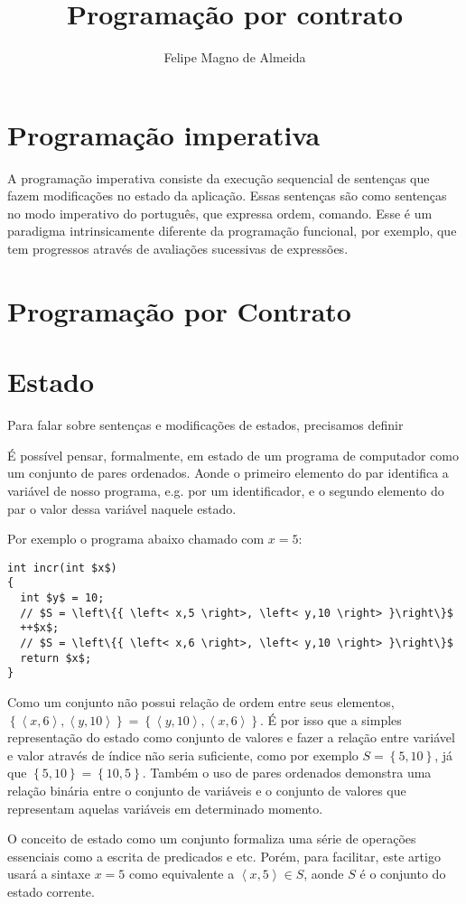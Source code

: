 \documentclass[12pt]{article}
\title{Programação por contrato}
\author{Felipe Magno de Almeida}
\begin{document}
 

\maketitle
     
\begin{resumo} 
  
\end{resumo}

\section{Programação imperativa}

A programação imperativa consiste da execução sequencial de sentenças
que fazem modificações no estado da aplicação. Essas sentenças são
como sentenças no modo imperativo do português, que expressa ordem,
comando. Esse é um paradigma intrinsicamente diferente da programação
funcional, por exemplo, que tem progressos através de avaliações
sucessivas de expressões.

\section{Programação por Contrato}



\section{Estado}

Para falar sobre sentenças e modificações de estados, precisamos definir 

É possível pensar, formalmente, em estado de um programa de computador
como um conjunto de pares ordenados. Aonde o primeiro elemento do par
identifica a variável de nosso programa, e.g. por um identificador, e
o segundo elemento do par o valor dessa variável naquele estado.

Por exemplo o programa abaixo chamado com $x=5$:

\begin{lstlisting}[mathescape=true]
int incr(int $x$)
{
  int $y$ = 10;
  // $S = \left\{{ \left< x,5 \right>, \left< y,10 \right> }\right\}$
  ++$x$;
  // $S = \left\{{ \left< x,6 \right>, \left< y,10 \right> }\right\}$
  return $x$;
}
\end{lstlisting}

Como um conjunto não possui relação de ordem entre seus elementos,
$\left\{{ \left< x,6 \right>, \left< y,10 \right> }\right\} = \left\{{
    \left< y,10 \right>, \left< x,6 \right> }\right\}$. É por isso que
a simples representação do estado como conjunto de valores e fazer a
relação entre variável e valor através de índice não seria suficiente,
como por exemplo $S = \left\{{5,10}\right\}$, já que
$\left\{{5,10}\right\} = \left\{{10,5}\right\}$. Também o uso de pares
ordenados demonstra uma relação binária entre o conjunto de variáveis
e o conjunto de valores que representam aquelas variáveis em
determinado momento.

O conceito de estado como um conjunto formaliza uma série de operações
essenciais como a escrita de predicados e etc. Porém, para facilitar,
este artigo usará a sintaxe $x = 5$ como equivalente a
$\left<x,5\right> \in S$, aonde $S$ é o conjunto do estado corrente.
\end{document}
